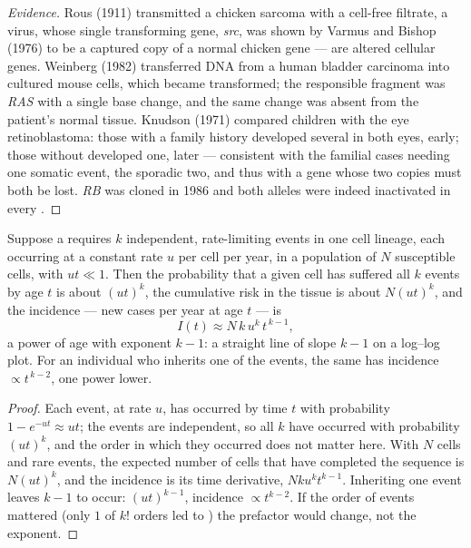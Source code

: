 \begin{proof}[Evidence]
Rous (1911) transmitted a chicken sarcoma with a cell-free filtrate,
a virus, whose single transforming gene, \emph{src}, was shown by
Varmus and Bishop (1976) to be a captured copy of a normal chicken gene
---  are altered cellular genes. Weinberg (1982) transferred
DNA from a human bladder carcinoma into cultured mouse cells, which
became transformed; the responsible fragment was \emph{RAS} with a
single base change, and the same change was absent from the patient's
normal tissue. Knudson (1971) compared children with the eye 
retinoblastoma: those with a family history developed several 
in both eyes, early; those without developed one, later --- consistent
with the familial cases needing one somatic event, the sporadic two,
and thus with a gene whose two copies must both be lost. \emph{RB} was
cloned in 1986 and both alleles were indeed inactivated in every
.
\end{proof}

\begin{theorem}\label{thm:b3:cancer-biology:armitage-doll}
Suppose a  requires $k$ independent, rate-limiting events in one
cell lineage, each occurring at a constant rate $u$ per cell per year,
in a population of $N$ susceptible cells, with $ut \ll 1$. Then the
probability that a given cell has suffered all $k$ events by age $t$ is
about $(ut)^{k}$, the cumulative risk in the tissue is about $N(ut)^{k}$,
and the incidence --- new cases per year at age $t$ --- is
\[
I(t) \approx N\,k\,u^{k}\,t^{\,k-1},
\]
a power of age with exponent $k - 1$: a straight line of slope $k - 1$
on a log--log plot. For an individual who inherits one of the events,
the same  has incidence $\propto t^{\,k-2}$, one power lower.
\end{theorem}
\begin{proof}
Each event, at rate $u$, has occurred by time $t$ with probability
$1 - e^{-ut} \approx ut$; the events are independent, so all $k$ have
occurred with probability $(ut)^{k}$, and the order in which they
occurred does not matter here. With $N$ cells and rare events, the
expected number of cells that have completed the sequence is
$N(ut)^{k}$, and the incidence is its time derivative, $Nku^{k}t^{k-1}$.
Inheriting one event leaves $k - 1$ to occur: $(ut)^{k-1}$, incidence
$\propto t^{k-2}$. If the order of events mattered (only $1$ of $k!$
orders led to ) the prefactor would change, not the exponent.
\end{proof}

